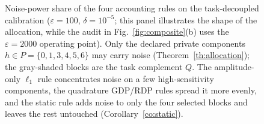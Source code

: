 \begin{figure}[t]
\caption{Noise-power share of the four accounting rules on the task-decoupled
calibration ($\varepsilon{=}100$, $\delta{=}10^{-5}$; this panel illustrates
the shape of the allocation, while the audit in Fig.~\ref{fig:composite}(b)
uses the $\varepsilon{=}2000$ operating point). Only the declared private
components $h\in P=\{0,1,3,4,5,6\}$ may carry noise
(Theorem~\ref{th:allocation}); the gray-shaded blocks are the task complement
$Q$. The amplitude-only $\ell_1$ rule concentrates noise on a few high-sensitivity
components, the quadrature GDP/RDP rules spread it more evenly, and the static
rule adds noise to only the four selected blocks and leaves the rest untouched
(Corollary~\ref{co:static}).}
\label{fig:budget_split}
\end{figure}

